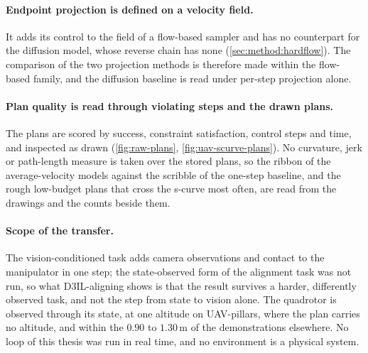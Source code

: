 \paragraph{Endpoint projection is defined on a velocity field.} It adds its control to the field of a
flow-based sampler and has no counterpart for the diffusion model, whose reverse chain has none
(\autoref{sec:method:hardflow}). The comparison of the two projection methods is therefore made within
the flow-based family, and the diffusion baseline is read under per-step projection alone.

\paragraph{Plan quality is read through violating steps and the drawn plans.} The plans are scored by
success, constraint satisfaction, control steps and time, and inspected as drawn (\autoref{fig:raw-plans},
\autoref{fig:uav-scurve-plans}). No curvature, jerk or path-length measure is taken over the stored
plans, so the ribbon of the average-velocity models against the scribble of the one-step baseline, and
the rough low-budget plans that cross the s-curve most often, are read from the drawings and the counts
beside them.

\paragraph{Scope of the transfer.} The vision-conditioned task adds camera observations and contact to
the manipulator in one step; the state-observed form of the alignment task was not run, so what
D3IL-aligning shows is that the result survives a harder, differently observed task, and not the step
from state to vision alone. The quadrotor is observed through its state, at one altitude on UAV-pillars,
where the plan carries no altitude, and within the $0.90$ to $1.30$\,m of the demonstrations elsewhere.
No loop of this thesis was run in real time, and no environment is a physical system.
